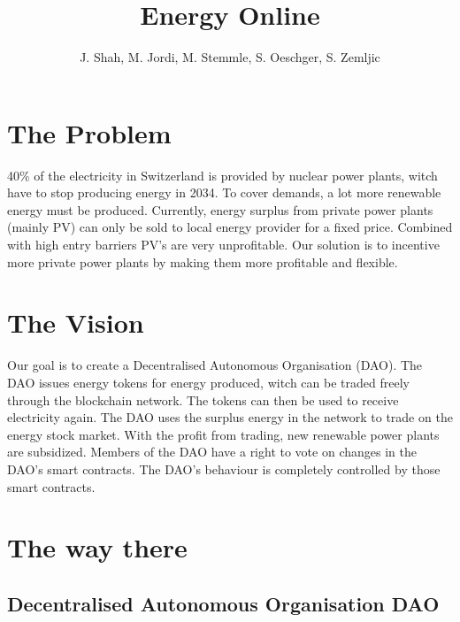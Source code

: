 \documentclass{scrartcl}
\begin{document}
	
	\title{Energy Online}
	\subtitle{}
	\author{J. Shah, M. Jordi, M. Stemmle, S. Oeschger, S. Zemljic}
	
	\maketitle
	
	\section{The Problem}
	
	40\% of the electricity in Switzerland is provided by nuclear power plants, witch have to stop producing energy in 2034. To cover demands, a lot more renewable energy must be produced. 
	Currently, energy surplus from private power plants (mainly PV) can only be sold to local energy provider for a fixed price. Combined with high entry barriers PV's are very unprofitable.
	Our solution is to incentive more private power plants by making them more profitable and flexible.
	
	\section{The Vision}
	
	Our goal is to create a Decentralised Autonomous Organisation (DAO). The DAO issues energy tokens for energy produced, witch can be traded freely through the blockchain network. The tokens can then be used to receive electricity again. The DAO uses the surplus energy in the network to trade on the energy stock market. With the profit from trading, new renewable power plants are subsidized. Members of the DAO have a right to vote on changes in the DAO's smart contracts. The DAO's behaviour is completely controlled by those smart contracts.  
	
	\section{The way there}
	
	\subsection{Decentralised Autonomous Organisation DAO}
	
	
	
\end{document}
